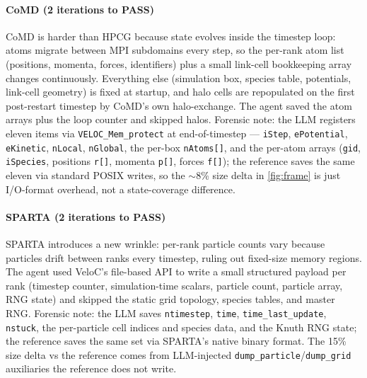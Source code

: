 \documentclass[conference]{IEEEtran}
\begin{document}
\paragraph{CoMD (2 iterations to PASS)}
CoMD is harder than HPCG because state evolves inside the timestep loop: atoms migrate between MPI subdomains every step, so the per-rank atom list (positions, momenta, forces, identifiers) plus a small link-cell bookkeeping array changes continuously. Everything else (simulation box, species table, potentials, link-cell geometry) is fixed at startup, and halo cells are repopulated on the first post-restart timestep by CoMD's own halo-exchange. The agent saved the atom arrays plus the loop counter and skipped halos. Forensic note: the LLM registers eleven items via \texttt{VELOC\_Mem\_protect} at end-of-timestep --- \texttt{iStep}, \texttt{ePotential}, \texttt{eKinetic}, \texttt{nLocal}, \texttt{nGlobal}, the per-box \texttt{nAtoms[]}, and the per-atom arrays (\texttt{gid}, \texttt{iSpecies}, positions \texttt{r[]}, momenta \texttt{p[]}, forces \texttt{f[]}); the reference saves the same eleven via standard POSIX writes, so the $\sim$8\% size delta in \autoref{fig:frame} is just I/O-format overhead, not a state-coverage difference.

\paragraph{SPARTA (2 iterations to PASS)}
SPARTA introduces a new wrinkle: per-rank particle counts vary because particles drift between ranks every timestep, ruling out fixed-size memory regions. The agent used VeloC's file-based API to write a small structured payload per rank (timestep counter, simulation-time scalars, particle count, particle array, RNG state) and skipped the static grid topology, species tables, and master RNG. Forensic note: the LLM saves \texttt{ntimestep}, \texttt{time}, \texttt{time\_last\_update}, \texttt{nstuck}, the per-particle cell indices and species data, and the Knuth RNG state; the reference saves the same set via SPARTA's native binary format. The 15\% size delta vs the reference comes from LLM-injected \texttt{dump\_particle}/\texttt{dump\_grid} auxiliaries the reference does not write.
\end{document}
